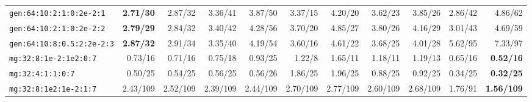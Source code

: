 {\begin{longtable}{lrrrrrrrrrr}
\texttt{gen:64:10:2:1:0:2e-2:1} & \textbf{2.71/30} & 2.87/32 & 3.36/41 & 3.87/50 & 3.37/15 & 4.20/20 & 3.62/23 & 3.85/26 & 2.86/42 & 4.86/62 \\
\texttt{gen:64:10:2:1:0:2e-2:2} & \textbf{2.79/29} & 2.84/32 & 3.40/42 & 4.28/56 & 3.70/20 & 4.85/27 & 3.80/26 & 4.16/29 & 3.01/43 & 4.69/59 \\
\texttt{gen:64:10:8:0.5:2:2e-2:3} & \textbf{2.87/32} & 2.91/34 & 3.35/40 & 4.19/54 & 3.60/16 & 4.61/22 & 3.68/25 & 4.01/28 & 5.62/95 & 7.33/97 \\
\texttt{mg:32:8:1e-2:1e2:0:7} & 0.73/16 & 0.71/16 & 0.75/18 & 0.93/25 & 1.22/8 & 1.65/11 & 1.18/11 & 1.19/13 & 0.65/16 & \textbf{0.52/16} \\
\texttt{mg:32:4:1:1:0:7} & 0.50/25 & 0.54/25 & 0.56/25 & 0.56/26 & 1.86/25 & 1.96/25 & 0.88/25 & 0.92/25 & 0.34/25 & \textbf{0.32/25} \\
\texttt{mg:32:8:1e2:1e-2:1:7} & 2.43/109 & 2.52/109 & 2.39/109 & 2.44/109 & 2.70/109 & 2.77/109 & 2.60/109 & 2.68/109 & 1.76/91 & \textbf{1.56/109} \\
\end{longtable}}
